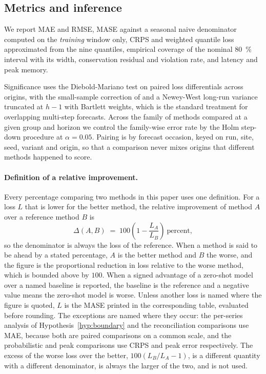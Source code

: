 \documentclass[utf8]{FrontiersinHarvard}
\newif\ifsecondrevisionmarkup
\newcommand{\rev}[1]{\ifsecondrevisionmarkup\textcolor{revisiontwo}{#1}\else#1\fi}
\theoremstyle{plain}
\theoremstyle{definition}
\theoremstyle{remark}
\begin{document}
\subsection{Metrics and inference}
\label{sec:metrics}

We report MAE and RMSE, MASE against a seasonal naive denominator computed on the \emph{training} window only, CRPS and weighted quantile loss approximated from the nine quantiles, empirical coverage of the nominal \SI{80}{\percent} interval with its width, conservation residual and violation rate, and latency and peak memory.

Significance uses the Diebold-Mariano test \citep{diebold1995} on paired loss differentials across origins, with the small-sample correction of \citet{harvey1997} and a Newey-West long-run variance \citep{newey1987} truncated at $h-1$ with Bartlett weights, which is the standard treatment for overlapping multi-step forecasts. Across the family of methods compared at a given group and horizon we control the family-wise error rate by the Holm step-down procedure \citep{holm1979} at $\alpha=0.05$. Pairing is by forecast occasion, keyed on run, site, seed, variant and origin, so that a comparison never mixes origins that different methods happened to score.

\rev{\paragraph{Definition of a relative improvement.} Every percentage comparing two methods in this paper uses one definition. For a loss $L$ that is lower for the better method, the relative improvement of method $A$ over a reference method $B$ is
\begin{equation}
\Delta(A,B) \;=\; 100\left(1 - \frac{L_A}{L_B}\right)\ \text{percent},
\label{eq:relimp}
\end{equation}
so the denominator is always the loss of the reference. When a method is said to be ahead by a stated percentage, $A$ is the better method and $B$ the worse, and the figure is the proportional reduction in loss relative to the worse method, which is bounded above by $100$. When a signed advantage of a zero-shot model over a named baseline is reported, the baseline is the reference and a negative value means the zero-shot model is worse. Unless another loss is named where the figure is quoted, $L$ is the MASE printed in the corresponding table, evaluated before rounding. The exceptions are named where they occur: the per-series analysis of Hypothesis~\ref{hyp:boundary} and the reconciliation comparisons use MAE, because both are paired comparisons on a common scale, and the probabilistic and peak comparisons use CRPS and peak error respectively. The excess of the worse loss over the better, $100(L_B/L_A - 1)$, is a different quantity with a different denominator, is always the larger of the two, and is not used.}
\end{document}
